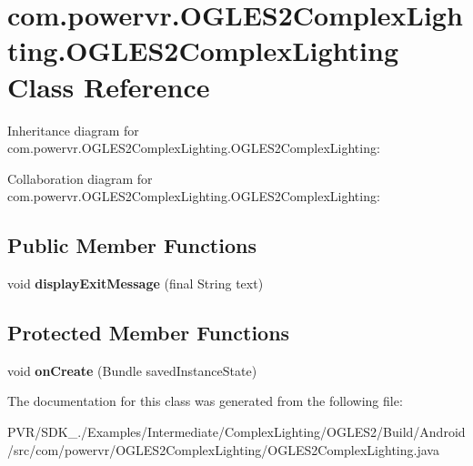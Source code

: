 \hypertarget{classcom_1_1powervr_1_1_o_g_l_e_s2_complex_lighting_1_1_o_g_l_e_s2_complex_lighting}{\section{com.\+powervr.\+O\+G\+L\+E\+S2\+Complex\+Lighting.\+O\+G\+L\+E\+S2\+Complex\+Lighting Class Reference}
\label{classcom_1_1powervr_1_1_o_g_l_e_s2_complex_lighting_1_1_o_g_l_e_s2_complex_lighting}
}


Inheritance diagram for com.\+powervr.\+O\+G\+L\+E\+S2\+Complex\+Lighting.\+O\+G\+L\+E\+S2\+Complex\+Lighting\+:


Collaboration diagram for com.\+powervr.\+O\+G\+L\+E\+S2\+Complex\+Lighting.\+O\+G\+L\+E\+S2\+Complex\+Lighting\+:
\subsection*{Public Member Functions}
\begin{DoxyCompactItemize}
\item 
\hypertarget{classcom_1_1powervr_1_1_o_g_l_e_s2_complex_lighting_1_1_o_g_l_e_s2_complex_lighting_a8b1040b33413313d871759c1edb704be}{void {\bfseries display\+Exit\+Message} (final String text)}\label{classcom_1_1powervr_1_1_o_g_l_e_s2_complex_lighting_1_1_o_g_l_e_s2_complex_lighting_a8b1040b33413313d871759c1edb704be}

\end{DoxyCompactItemize}
\subsection*{Protected Member Functions}
\begin{DoxyCompactItemize}
\item 
\hypertarget{classcom_1_1powervr_1_1_o_g_l_e_s2_complex_lighting_1_1_o_g_l_e_s2_complex_lighting_a7c6d2c80a62808804306900f597ed34f}{void {\bfseries on\+Create} (Bundle saved\+Instance\+State)}\label{classcom_1_1powervr_1_1_o_g_l_e_s2_complex_lighting_1_1_o_g_l_e_s2_complex_lighting_a7c6d2c80a62808804306900f597ed34f}

\end{DoxyCompactItemize}


The documentation for this class was generated from the following file\+:\begin{DoxyCompactItemize}
\item 
P\+V\+R/\+S\+D\+K\+\_./\+Examples/\+Intermediate/\+Complex\+Lighting/\+O\+G\+L\+E\+S2/\+Build/\+Android/src/com/powervr/\+O\+G\+L\+E\+S2\+Complex\+Lighting/O\+G\+L\+E\+S2\+Complex\+Lighting.\+java\end{DoxyCompactItemize}
